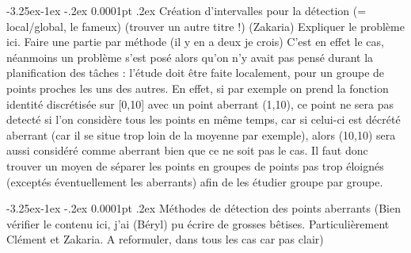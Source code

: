\documentclass[a4paper,12pt]{article} %
\makeatletter
\renewcommand\paragraph{\@startsection{paragraph}{4}{\z@}%
                                      {-3.25ex\@plus -1ex \@minus -.2ex}%
                                      {0.0001pt \@plus .2ex}%
                                      {\normalfont\normalsize\bfseries}}
\makeatother
\begin{document}
				\paragraph{Création d'intervalles pour la détection (= local/global, le fameux) (trouver un autre titre !)}
    				(Zakaria)
    				Expliquer le problème ici.
    				Faire une partie par méthode (il y en a deux je crois)
    				C'est en effet le cas, néanmoins un problème s'est posé alors qu'on n'y avait pas pensé durant la planification des tâches : l'étude doit être faite localement, pour un groupe de points proches les uns des autres. En effet, si par exemple on prend la fonction identité discrétisée sur [0,10] avec un point aberrant (1,10), ce point ne sera pas detecté si l'on considère tous les points en même temps, car si celui-ci est décrété aberrant (car il se situe trop loin de la moyenne par exemple), alors (10,10) sera aussi considéré comme aberrant bien que ce ne soit pas le cas. Il faut donc trouver un moyen de séparer les points en groupes de points pas trop éloignés (exceptés éventuellement les aberrants) afin de les étudier groupe par groupe.

				\paragraph{Méthodes de détection des points aberrants}
    				(Bien vérifier le contenu ici, j'ai (Béryl) pu écrire de grosses bêtises. Particulièrement Clément et Zakaria. A reformuler, dans tous les cas car pas clair) 
    				
\end{document}
